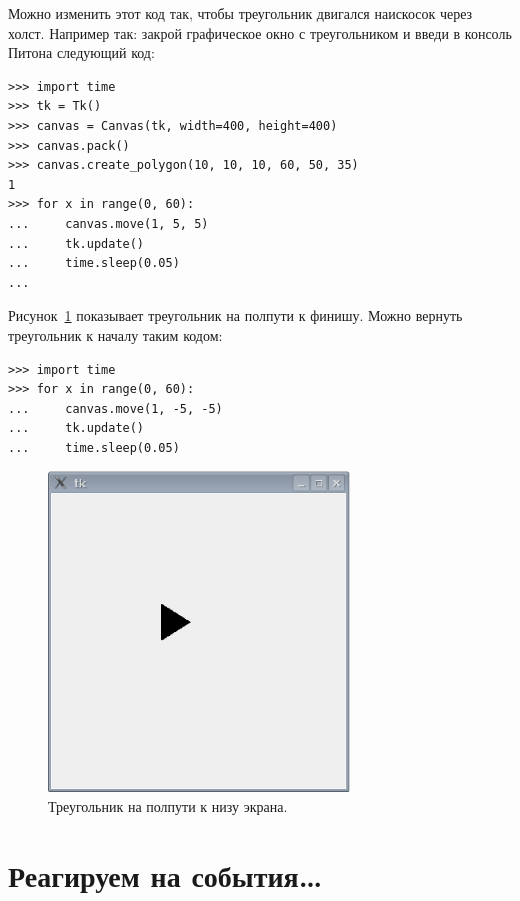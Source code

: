 Можно изменить этот код так, чтобы треугольник двигался наискосок через холст. Например так: закрой графическое окно с треугольником и введи в консоль Питона следующий код:

\begin{listing}
\begin{verbatim}
>>> import time
>>> tk = Tk()
>>> canvas = Canvas(tk, width=400, height=400)
>>> canvas.pack()
>>> canvas.create_polygon(10, 10, 10, 60, 50, 35)
1
>>> for x in range(0, 60):
...     canvas.move(1, 5, 5)
...     tk.update()
...     time.sleep(0.05)
...
\end{verbatim}
\end{listing}

Рисунок \ref{fig45} показывает треугольник на полпути к финишу. Можно вернуть треугольник к началу таким кодом:

\begin{listing}
\begin{verbatim}
>>> import time
>>> for x in range(0, 60):
...     canvas.move(1, -5, -5)
...     tk.update()
...     time.sleep(0.05)
\end{verbatim}
\end{listing}

\begin{figure}
\begin{center}
\includegraphics[width=80mm]{../en/figure45.eps}
\end{center}
\caption{Треугольник на полпути к низу экрана.}\label{fig45}
\end{figure}

\section{Реагируем на события…}

